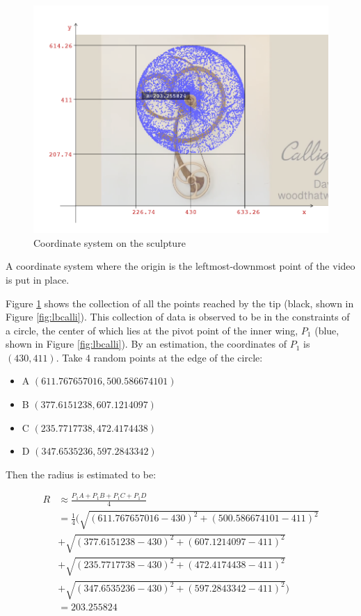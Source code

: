 \documentclass[a4paper,12pt]{article}
\begin{document}
\begin{figure}[H]
    \begin{center}
        \includegraphics[width=\textwidth]{sculpt-cartesian} 
    \end{center}
    \caption{Coordinate system on the sculpture}
    \label{fig:sculpt-cartesian}
\end{figure}

A coordinate system where the origin is the leftmost-downmost point of the video is put in place.
  
Figure \ref{fig:sculpt-cartesian} shows the collection of all the points reached by the tip (black, shown in Figure \ref{fig:lbcalli}). This collection of data is observed to be in the constraints of a circle, the center of which lies at the pivot point of the inner wing, $P_1$ (blue, shown in Figure \ref{fig:lbcalli}). By an estimation, the coordinates of $P_1$ is $(430, 411)$. Take 4 random points at the edge of the circle:

\begin{itemize}
    \item A $(611.767657016, 500.586674101)$
    \item B $(377.6151238, 607.1214097)$
    \item C $(235.7717738, 472.4174438)$
    \item D $(347.6535236, 597.2843342)$
\end{itemize}

Then the radius is estimated to be:

\begin{align*}
    R &\approx \frac{P_1A+P_1B+P_1C+P_1D}{4}
    \\
    &=\frac{1}{4}(\sqrt{(611.767657016-430)^2 + (500.586674101-411)^2}\\
    &+\sqrt{(377.6151238-430)^2 + (607.1214097-411)^2}\\
    &+\sqrt{(235.7717738-430)^2 + ( 472.4174438-411)^2}\\
    &+\sqrt{(347.6535236-430)^2 + ( 597.2843342-411)^2})
    \\
    &=203.255824
\end{align*}
\end{document}

